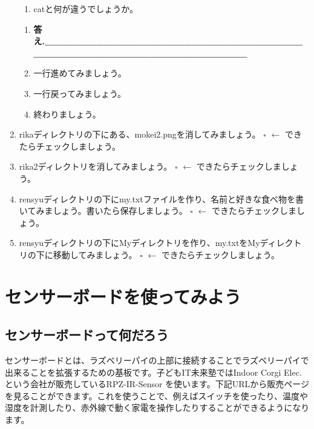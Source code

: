 \documentclass[a4paper,dvipdfmx]{jarticle}
\newcounter{saveenum}
\begin{document}
\begin{enumerate}
\setcounter{saveenum}{\value{enumii}}
\begin{enumerate}
\setcounter{enumii}{\value{saveenum}}
\item catと何が違うでしょうか。
\end{enumerate}

\bigskip

\setcounter{saveenum}{\value{enumii}}
\begin{enumerate}
\setcounter{enumii}{\value{saveenum}}
\item[] 
\bigskip

{\ttfamily\bfseries
答え.\_\_\_\_\_\_\_\_\_\_\_\_\_\_\_\_\_\_\_\_\_\_\_\_\_\_\_\_\_\_\_\_\_\_\_\_\_\_\_\_\_\_\_\_\_\_\_\_\_\_\_\_\_\_\_\_\_\_\_\_\_\_\_\_}


\bigskip
\item 一行進めてみましょう。
\item 一行戻ってみましょう。
\item 終わりましょう。
\end{enumerate}
\item
rikaディレクトリの下にある、mokei2.pngを消してみましょう。\newline
${\square}$ $\leftarrow $
できたらチェックしましょう。
\item
rika2ディレクトリを消してみましょう。\newline
${\square}$ $\leftarrow $
できたらチェックしましょう。
\item
rensyuディレクトリの下にmy.txtファイルを作り、名前と好きな食べ物を書いてみましょう。書いたら保存しましょう。\newline
${\square}$ $\leftarrow $
できたらチェックしましょう。
\item
rensyuディレクトリの下にMyディレクトリを作り、my.txtをMyディレクトリの下に移動してみましょう。\newline
${\square}$ $\leftarrow $
できたらチェックしましょう。
\end{enumerate}
\clearpage
\bigskip

\section{センサーボードを使ってみよう}
\subsection{センサーボードって何だろう}
センサーボードとは、ラズベリーパイの上部に接続することでラズベリーパイで出来ることを拡張するための基板です。子どもIT未来塾ではIndoor
Corgi Elec. という会社が販売しているRPZ-IR-Sensor
を使います。下記URLから販売ページを見ることができます。これを使うことで、例えばスイッチを使ったり、温度や湿度を計測したり、赤外線で動く家電を操作したりすることができるようになります。
\end{document}
